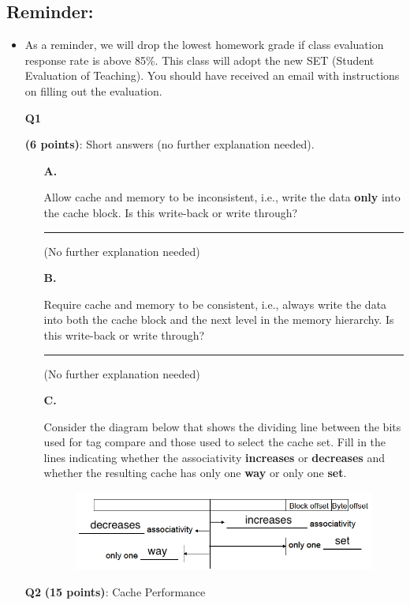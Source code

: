\documentclass[a4paper,10pt]{article}
\begin{document}
\subsection*{Reminder:}
\begin{itemize}
\item As a reminder, we will drop the lowest homework grade if class evaluation response rate is above 85\%. This class will adopt the new SET (Student Evaluation of Teaching). You should have received an email with instructions on filling out the evaluation.
\end{itemize}


\pagebreak

\begin{enumerate}
    \item[\textbf{Q1}]{\textbf{(6 points)}: 
        Short answers (no further explanation needed). \\
        \begin{enumerate}
            \item[\textbf{A.}]{Allow cache and memory to be inconsistent, i.e., write the data \textbf{only} into the cache
                block. Is this write-back or write through? \\\rule{3cm}{0.4pt} (No further explanation
                needed)
            }
            \item[\textbf{B.}]{Require cache and memory to be consistent, i.e., always write the data into both
                the cache block and the next level in the memory hierarchy. Is this write-back or
                write through? \\\rule{3cm}{0.4pt} (No further explanation needed)
            }
            \item[\textbf{C.}]{Consider the diagram below that shows the dividing line between the bits used for tag 
                compare and those used to select the cache set. Fill in the lines indicating whether the 
                associativity \textbf{increases} or \textbf{decreases} and whether the resulting cache has only one \textbf{way} or only one \textbf{set}.
                \begin{figure}[!hbpt]
                    \centerline{\includegraphics[scale = 0.7]{cacheAssociativity.png}}
                    \label{cacheAssociativity}
                \end{figure}
            }
        \end{enumerate}
    }
    \item[\textbf{Q2}]{\textbf{(15 points)}: Cache Performance \\
    
}
\end{enumerate}
\end{document}

